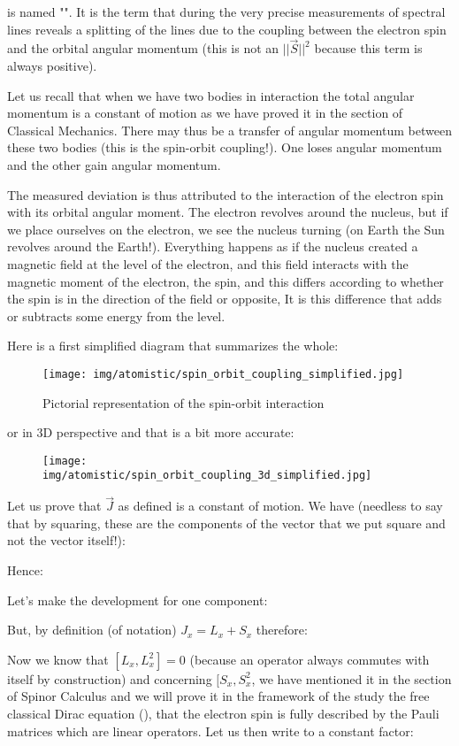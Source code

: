 	is named "". It is the term that during the very precise measurements of spectral lines reveals a splitting of the lines due to the coupling between the electron spin and the orbital angular momentum (this is not an $||\vec{S}||^2$ because this term is always positive).
	\begin{tcolorbox}[title=Remark,colframe=black,arc=10pt]
	Let us recall that when we have two bodies in interaction the total angular momentum is a constant of motion as we have proved it in the section of Classical Mechanics. There may thus be a transfer of angular momentum between these two bodies (this is the spin-orbit coupling!). One loses angular momentum and the other gain angular momentum.
	\end{tcolorbox}
	The measured deviation is thus attributed to the interaction of the electron spin with its orbital angular moment. The electron revolves around the nucleus, but if we place ourselves on the electron, we see the nucleus turning (on Earth the Sun revolves around the Earth!). Everything happens as if the nucleus created a magnetic field at the level of the electron, and this field interacts with the magnetic moment of the electron, the spin, and this differs according to whether the spin is in the direction of the field or opposite, It is this difference that adds or subtracts some energy from the level.
	
	Here is a first simplified diagram that summarizes the whole:
	\begin{figure}[H]
		\centering
		\texttt{[image: img/atomistic/spin\_orbit\_coupling\_simplified.jpg]}	
		\caption{Pictorial representation of the spin-orbit interaction}
	\end{figure}
	or in $3$D perspective and that is a bit more accurate:
	\begin{figure}[H]
		\centering
		\texttt{[image: img/atomistic/spin\_orbit\_coupling\_3d\_simplified.jpg]}
	\end{figure}
	Let us prove that $\vec{J}$ as defined is a constant of motion. We have (needless to say that by squaring, these are the components of the vector that we put square and not the vector itself!):
	
	Hence:
	
	Let's make the development for one  component:
	
	But, by definition (of notation) $J_x=L_x+S_x$ therefore:
	
	Now we know that $[L_x,L_x^2]=0$ (because an operator always commutes with itself by construction) and concerning $[S_x,S_x^2$, we have mentioned it in the section of Spinor Calculus and we will prove it in the framework of the study the free classical Dirac equation (), that the electron spin is fully described by the Pauli matrices which are linear operators. Let us then write to a constant factor:
	
